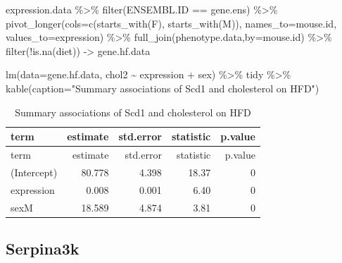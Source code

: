 \documentclass[
]{article}
\newenvironment{Shaded}{\begin{snugshade}}{\end{snugshade}}
\newcommand{\AttributeTok}[1]{\textcolor[rgb]{0.77,0.63,0.00}{#1}}
\newcommand{\FunctionTok}[1]{\textcolor[rgb]{0.00,0.00,0.00}{#1}}
\newcommand{\NormalTok}[1]{#1}
\newcommand{\OtherTok}[1]{\textcolor[rgb]{0.56,0.35,0.01}{#1}}
\newcommand{\SpecialCharTok}[1]{\textcolor[rgb]{0.00,0.00,0.00}{#1}}
\newcommand{\StringTok}[1]{\textcolor[rgb]{0.31,0.60,0.02}{#1}}
\begin{document}
\begin{Shaded}
\begin{Highlighting}[]
\NormalTok{expression.data }\SpecialCharTok{\%\textgreater{}\%}
  \FunctionTok{filter}\NormalTok{(ENSEMBL.ID }\SpecialCharTok{==}\NormalTok{ gene.ens) }\SpecialCharTok{\%\textgreater{}\%}
  \FunctionTok{pivot\_longer}\NormalTok{(}\AttributeTok{cols=}\FunctionTok{c}\NormalTok{(}\FunctionTok{starts\_with}\NormalTok{(}\StringTok{\textquotesingle{}F\textquotesingle{}}\NormalTok{),}
                      \FunctionTok{starts\_with}\NormalTok{(}\StringTok{\textquotesingle{}M\textquotesingle{}}\NormalTok{)),}
               \AttributeTok{names\_to=}\StringTok{\textquotesingle{}mouse.id\textquotesingle{}}\NormalTok{,}
               \AttributeTok{values\_to=}\StringTok{\textquotesingle{}expression\textquotesingle{}}\NormalTok{) }\SpecialCharTok{\%\textgreater{}\%}
  \FunctionTok{full\_join}\NormalTok{(phenotype.data,}\AttributeTok{by=}\StringTok{\textquotesingle{}mouse.id\textquotesingle{}}\NormalTok{) }\SpecialCharTok{\%\textgreater{}\%}
  \FunctionTok{filter}\NormalTok{(}\SpecialCharTok{!}\FunctionTok{is.na}\NormalTok{(diet)) }\OtherTok{{-}\textgreater{}}\NormalTok{ gene.hf.data}

\FunctionTok{lm}\NormalTok{(}\AttributeTok{data=}\NormalTok{gene.hf.data, chol2 }\SpecialCharTok{\textasciitilde{}}\NormalTok{ expression }\SpecialCharTok{+}\NormalTok{ sex) }\SpecialCharTok{\%\textgreater{}\%}
\NormalTok{  tidy }\SpecialCharTok{\%\textgreater{}\%}
  \FunctionTok{kable}\NormalTok{(}\AttributeTok{caption=}\StringTok{"Summary associations of Scd1 and cholesterol on HFD"}\NormalTok{)}
\end{Highlighting}
\end{Shaded}

\begin{longtable}[]{@{}lrrrr@{}}
\caption{Summary associations of Scd1 and cholesterol on
HFD}\tabularnewline
\toprule()
term & estimate & std.error & statistic & p.value \\
\midrule()
\endfirsthead
\toprule()
term & estimate & std.error & statistic & p.value \\
\midrule()
\endhead
(Intercept) & 80.778 & 4.398 & 18.37 & 0 \\
expression & 0.008 & 0.001 & 6.40 & 0 \\
sexM & 18.589 & 4.874 & 3.81 & 0 \\
\bottomrule()
\end{longtable}

\hypertarget{serpina3k}{%
\subsection{Serpina3k}\label{serpina3k}}
\end{document}
